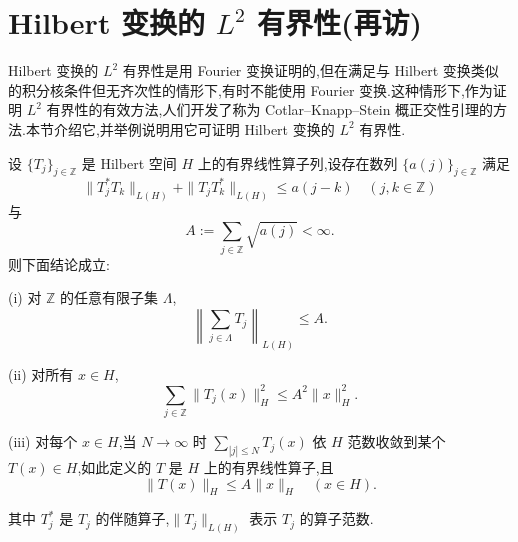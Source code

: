 \section{\texorpdfstring{Hilbert 变换的 $L^2$ 有界性(再访)}{Hilbert 变换的 L2 有界性(再访)}}\label{sec:1.10}


Hilbert 变换的 $L^{2}$ 有界性是用 Fourier 变换证明的,但在满足与 Hilbert 变换类似的积分核条件但无齐次性的情形下,有时不能使用 Fourier 变换.这种情形下,作为证明 $L^{2}$ 有界性的有效方法,人们开发了称为 Cotlar--Knapp--Stein 概正交性引理的方法.本节介绍它,并举例说明用它可证明 Hilbert 变换的 $L^{2}$ 有界性.

\begin{lemma}\label{lem:1.10.1}
设 $\{T_{j}\}_{j \in \mathbb{Z}}$ 是 Hilbert 空间 $H$ 上的有界线性算子列,设存在数列 $\{a(j)\}_{j \in \mathbb{Z}}$ 满足
\begin{equation}\tag{1.10.1}
\| T_{j}^{*}T_{k} \|_{L(H)} + \| T_{j}T_{k}^{*} \|_{L(H)} \leq a(j - k) \quad (j, k \in \mathbb{Z})
\label{eq:1.10.1}\end{equation}
与
\begin{equation}\tag{1.10.2}
A := \sum_{j \in \mathbb{Z}}\sqrt{a(j)} < \infty.
\label{eq:1.10.2}\end{equation}
则下面结论成立:

(i) 对 $\mathbb{Z}$ 的任意有限子集 $\Lambda$,
\begin{equation*}
\left\| \sum_{j \in \Lambda}T_{j} \right\|_{L(H)} \leq A.
\end{equation*}

(ii) 对所有 $x \in H$,
\begin{equation*}
\sum_{j \in \mathbb{Z}}\| T_{j}(x) \|_{H}^{2} \leq A^{2}\| x \|_{H}^{2}.
\end{equation*}

(iii) 对每个 $x \in H$,当 $N \to \infty$ 时 $\sum_{|j| \leq N}T_{j}(x)$ 依 $H$ 范数收敛到某个 $T(x) \in H$,如此定义的 $T$ 是 $H$ 上的有界线性算子,且
\begin{equation*}
\| T(x) \|_{H} \leq A\| x \|_{H} \quad (x \in H).
\end{equation*}

其中 $T_{j}^{*}$ 是 $T_{j}$ 的伴随算子,$\| T_{j} \|_{L(H)}$ 表示 $T_{j}$ 的算子范数.
\end{lemma}

